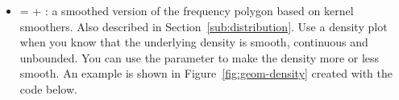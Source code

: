 \begin{itemize}

  \item {} =  + : a smoothed version of the frequency polygon based on kernel smoothers. Also described in Section~\ref{sub:distribution}. Use a density plot when you know that the underlying density is smooth, continuous and unbounded. You can use the  parameter to make the density more or less smooth. An example is shown in Figure~\ref{fig:geom-density} created with the code below.       

    

\end{itemize}

